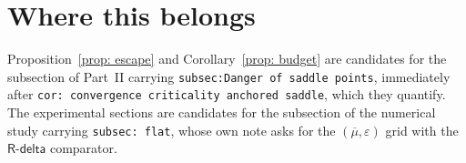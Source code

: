 \documentclass[11pt,a4paper]{article}
\providecommand{\Rdelta}{\textsf{R-delta}}
\theoremstyle{definition}
\theoremstyle{remark}
\begin{document}
\section{Where this belongs}\label{sec: home}

Proposition~\ref{prop: escape} and Corollary~\ref{prop: budget} are candidates
for the subsection of Part~II carrying \texttt{subsec:Danger of saddle points},
immediately after
\texttt{cor: convergence criticality anchored saddle}, which they quantify. The
experimental sections are candidates for the subsection of the numerical study
carrying \texttt{subsec: flat}, whose own note asks for the
$(\overline{\mu},\varepsilon)$ grid with the $\Rdelta$ comparator.
\end{document}
